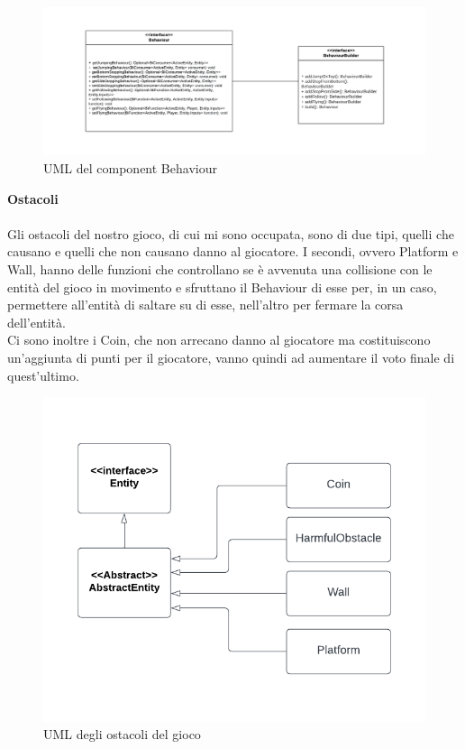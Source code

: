 \documentclass[a4paper,12pt]{report}
\begin{document}
\begin{figure}[ht]
\includegraphics[width=1\textwidth]{umlBehaviour.png}
\caption{UML del component Behaviour}
\label{fig:schgen}
\end{figure}

\newpage
\textbf{Ostacoli}\\
\\
Gli ostacoli del nostro gioco, di cui mi sono occupata, sono di due tipi, quelli che causano e quelli che non causano danno al giocatore. I secondi, ovvero Platform e Wall, hanno delle funzioni che controllano se è avvenuta una collisione con le entità del gioco in movimento e sfruttano il Behaviour di esse per, in un caso, permettere all'entità di saltare su di esse, nell'altro per fermare la corsa dell'entità.\\
Ci sono inoltre i Coin, che non arrecano danno al giocatore ma costituiscono un'aggiunta di punti per il giocatore, vanno quindi ad aumentare il voto finale di quest'ultimo.\\

\begin{figure}[ht]
\includegraphics[width=1\textwidth]{umlObstacles.png}
\caption{UML degli ostacoli del gioco}
\label{fig:schgen}
\end{figure}
\end{document}
